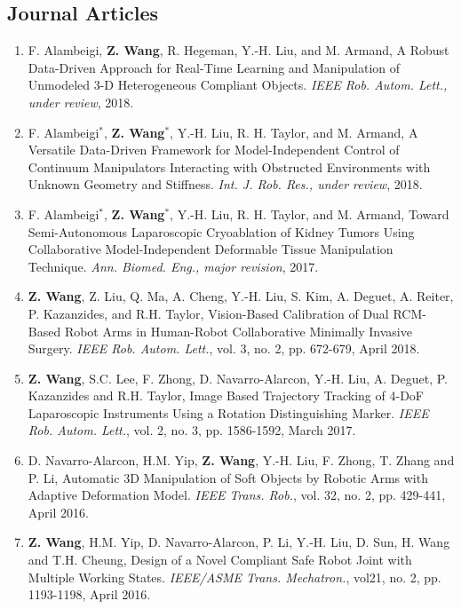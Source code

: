 \documentclass[10pt,letterpaper]{article}
\begin{document}
\subsection*{Journal Articles}
\begin{enumerate}
    \item F. Alambeigi, \textbf{Z. Wang}, R. Hegeman, Y.-H. Liu, and M. Armand,
    A Robust Data-Driven Approach for Real-Time Learning and Manipulation of Unmodeled 3-D Heterogeneous Compliant Objects.
    \textit{IEEE Rob. Autom. Lett., under review}, 2018.
    \item F. Alambeigi$^*$, \textbf{Z. Wang}$^*$, Y.-H. Liu, R. H. Taylor, and M. Armand,
    A Versatile Data-Driven Framework for Model-Independent Control of Continuum Manipulators Interacting with Obstructed Environments with Unknown Geometry and Stiffness.
    \textit{Int. J. Rob. Res., under review}, 2018.
    \item F. Alambeigi$^*$, \textbf{Z. Wang}$^*$, Y.-H. Liu, R. H. Taylor, and M. Armand,
    Toward Semi-Autonomous Laparoscopic Cryoablation of Kidney Tumors Using Collaborative Model-Independent Deformable Tissue Manipulation Technique.
    \textit{Ann. Biomed. Eng., major revision}, 2017.
    \item \textbf{Z. Wang}, Z. Liu, Q. Ma, A. Cheng, Y.-H. Liu, S. Kim, A. Deguet, A. Reiter, P. Kazanzides, and R.H. Taylor,
    Vision-Based Calibration of Dual RCM-Based Robot Arms in Human-Robot Collaborative Minimally Invasive Surgery.
    \textit{IEEE Rob. Autom. Lett.}, vol. 3, no. 2, pp. 672-679, April 2018.
    \item \textbf{Z. Wang}, S.C. Lee, F. Zhong, D. Navarro-Alarcon, Y.-H. Liu, A. Deguet, P. Kazanzides and R.H. Taylor,
    Image Based Trajectory Tracking of 4-DoF Laparoscopic Instruments Using a Rotation Distinguishing Marker.
    \textit{IEEE Rob. Autom. Lett.}, vol. 2, no. 3, pp. 1586-1592, March 2017.
    \item D. Navarro-Alarcon, H.M. Yip, \textbf{Z. Wang}, Y.-H. Liu, F. Zhong, T. Zhang and P. Li,
    Automatic 3D Manipulation of Soft Objects by Robotic Arms with Adaptive Deformation Model.
    \textit{{IEEE} Trans. Rob.}, vol. 32, no. 2, pp. 429-441, April 2016.
    \item \textbf{Z. Wang}, H.M. Yip, D. Navarro-Alarcon, P. Li, Y.-H. Liu, D. Sun, H. Wang and T.H. Cheung,
    Design of a Novel Compliant Safe Robot Joint with Multiple Working States.
    \textit{{IEEE/ASME} Trans. Mechatron.}, vol21, no. 2, pp. 1193-1198, April 2016.
\end{enumerate}
\end{document}
